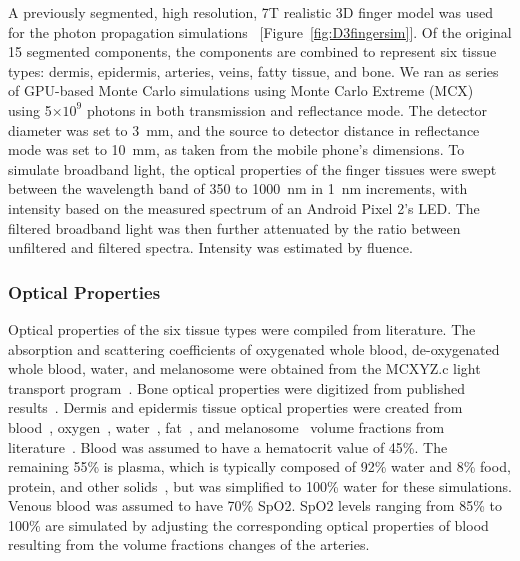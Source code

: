         A previously segmented, high resolution, 7T realistic 3D finger model was used for the photon propagation simulations~\cite{Laistler2018} [Figure~\ref{fig:D3fingersim}]. Of the original 15 segmented components, the components are combined to represent six tissue types: dermis, epidermis, arteries, veins, fatty tissue, and bone. We ran as series of GPU-based Monte Carlo simulations using Monte Carlo Extreme (MCX)~\cite{Fang2009b} using 5$\times 10^9$ photons in both transmission and reflectance mode. The detector diameter was set to 3~mm, and the source to detector distance in reflectance mode was set to 10~mm, as taken from the mobile phone's dimensions. To simulate broadband light, the optical properties of the finger tissues were swept between the wavelength band of 350 to 1000~nm in 1~nm increments, with intensity based on the measured spectrum of an Android Pixel 2's LED. The filtered broadband light was then further attenuated by the ratio between unfiltered and filtered spectra. Intensity was estimated by fluence.  
        
        \subsubsection{Optical Properties}
        Optical properties of the six tissue types were compiled from literature. The absorption and scattering coefficients of oxygenated whole blood, de-oxygenated whole blood, water, and melanosome were obtained from the MCXYZ.c light transport program~\cite{JacquesMCXYZ}. Bone optical properties were digitized from published results~\cite{KonugoluVenkataSekar2016}. Dermis and epidermis tissue optical properties were created from blood~\cite{Prahl2012}, oxygen~\cite{Jacques2013}, water~\cite{Hale1973}, fat~\cite{VanVeen2004}, and melanosome~\cite{Jacques1991} volume fractions from literature~\cite{Jacques2013}. Blood was assumed to have a hematocrit value of 45\%. The remaining 55\% is plasma, which is typically composed of 92\% water and 8\% food, protein, and other solids~\cite{Jacques2013}, but was simplified to 100\% water for these simulations. Venous blood was assumed to have 70\% SpO2. SpO2 levels ranging from 85\% to 100\% are simulated by adjusting the corresponding optical properties of blood resulting from the volume fractions changes of the arteries. 
        
